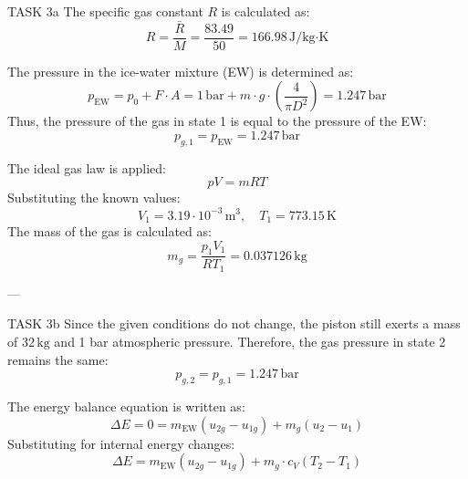 TASK 3a  
The specific gas constant \( R \) is calculated as:  
\[
R = \frac{\bar{R}}{M} = \frac{83.49}{50} = 166.98 \, \text{J/kg·K}
\]

The pressure in the ice-water mixture (EW) is determined as:  
\[
p_{\text{EW}} = p_0 + F \cdot A = 1 \, \text{bar} + m \cdot g \cdot \left(\frac{4}{\pi D^2}\right) = 1.247 \, \text{bar}
\]  
Thus, the pressure of the gas in state 1 is equal to the pressure of the EW:  
\[
p_{g,1} = p_{\text{EW}} = 1.247 \, \text{bar}
\]

The ideal gas law is applied:  
\[
pV = mRT
\]  
Substituting the known values:  
\[
V_1 = 3.19 \cdot 10^{-3} \, \text{m}^3, \quad T_1 = 773.15 \, \text{K}
\]  
The mass of the gas is calculated as:  
\[
m_g = \frac{p_1 V_1}{R T_1} = 0.037126 \, \text{kg}
\]

---

TASK 3b  
Since the given conditions do not change, the piston still exerts a mass of \( 32 \, \text{kg} \) and 1 bar atmospheric pressure. Therefore, the gas pressure in state 2 remains the same:  
\[
p_{g,2} = p_{g,1} = 1.247 \, \text{bar}
\]

The energy balance equation is written as:  
\[
\Delta E = 0 = m_{\text{EW}} (u_{2g} - u_{1g}) + m_g (u_2 - u_1)
\]  
Substituting for internal energy changes:  
\[
\Delta E = m_{\text{EW}} (u_{2g} - u_{1g}) + m_g \cdot c_V (T_2 - T_1)
\]